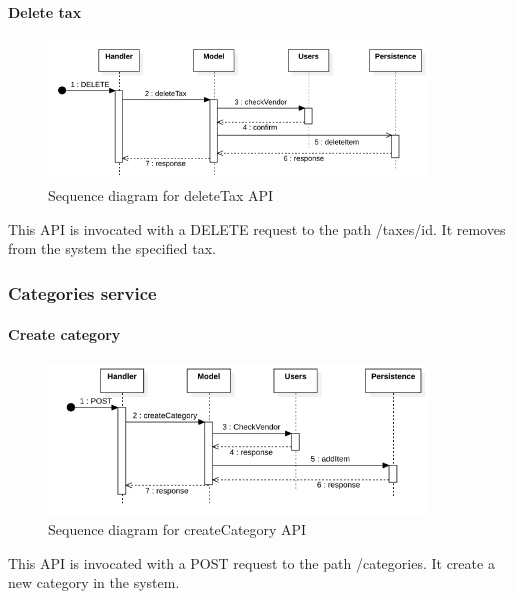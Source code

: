 \paragraph*{Delete tax}
\begin{figure}[H]
    \includegraphics[width=0.9\textwidth]{res/images/sequence-diagrams/taxes/deleteTax.png}
    \caption{Sequence diagram for deleteTax API}
\end{figure}
This API is invocated with a DELETE request to the path /taxes/{id}. It removes from the system the specified tax.

\subsubsection{Categories service}
\paragraph*{Create category}
\begin{figure}[H]
    \includegraphics[width=0.9\textwidth]{res/images/sequence-diagrams/categories/createCategory.png}
    \caption{Sequence diagram for createCategory API}
\end{figure}
This API is invocated with a POST request to the path /categories. It create a new category in the system.

